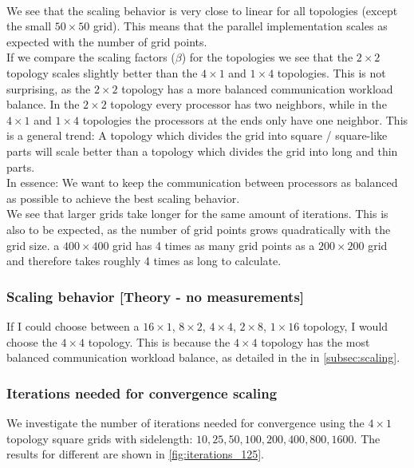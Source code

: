 \\
We see that the scaling behavior is very close to linear for all topologies (except the small $50\times50$ grid). This means that the parallel implementation scales as expected with the number of grid points.\\
If we compare the scaling factors ($\beta$) for the topologies we see that the $2\times 2$ topology scales slightly better than the $4\times 1$ and $1\times 4$ topologies. This is not surprising, as the $2\times 2$ topology has a more balanced communication workload balance. In the $2\times 2$ topology every processor has two neighbors, while in the $4\times 1$ and $1\times 4$ topologies the processors at the ends only have one neighbor. This is a general trend: A topology which divides the grid into square / square-like parts will scale better than a topology which divides the grid into long and thin parts.\\
In essence: We want to keep the communication between processors as balanced as possible to achieve the best scaling behavior.
\\
We see that larger grids take longer for the same amount of iterations. This is also to be expected, as the number of grid points grows quadratically with the grid size. a $400 \times 400$ grid has 4 times as many grid points as a $200 \times 200$ grid and therefore takes roughly 4 times as long to calculate. 


\subsubsection{Scaling behavior [Theory - no measurements]}
If I could choose between a $16 \times 1$, $8 \times 2$, $4 \times4$, $2 \times 8$, $1 \times 16$ topology, I would choose the $4 \times 4$ topology. This is because the $4 \times 4$ topology has the most balanced communication workload balance, as detailed in the  in \autoref{subsec:scaling}.

\subsubsection{Iterations needed for convergence scaling}
We investigate the number of iterations needed for convergence using the $4 \times 1$ topology square grids with sidelength: $10, 25, 50, 100, 200, 400, 800, 1600$. The results for different \Shining{$\omega$} are shown in \autoref{fig:iterations_125}.

